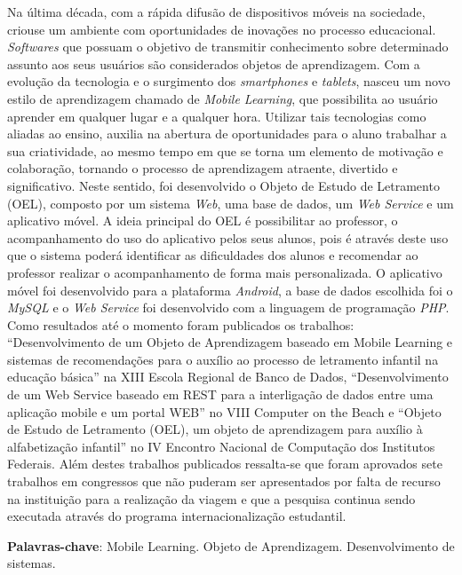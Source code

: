 \documentclass[article,12pt,onesidea,4paper,english,brazil]{abntex2}
\begin{document}
	\noindent Na última década, com a rápida difusão de dispositivos móveis na sociedade, criouse
	um ambiente com oportunidades de inovações no processo educacional.
	\textit{Softwares} que possuam o objetivo de transmitir conhecimento sobre determinado
	assunto aos seus usuários são considerados objetos de aprendizagem. Com a
	evolução da tecnologia e o surgimento dos \textit{smartphones} e \textit{tablets}, nasceu um novo
	estilo de aprendizagem chamado de \textit{Mobile Learning}, que possibilita ao usuário
	aprender em qualquer lugar e a qualquer hora. Utilizar tais tecnologias como aliadas
	ao ensino, auxilia na abertura de oportunidades para o aluno trabalhar a sua
	criatividade, ao mesmo tempo em que se torna um elemento de motivação e
	colaboração, tornando o processo de aprendizagem atraente, divertido e
	significativo. Neste sentido, foi desenvolvido o Objeto de Estudo de Letramento
	(OEL), composto por um sistema \textit{Web}, uma base de dados, um \textit{Web Service} e um
	aplicativo móvel. A ideia principal do OEL é possibilitar ao professor, o
	acompanhamento do uso do aplicativo pelos seus alunos, pois é através deste uso
	que o sistema poderá identificar as dificuldades dos alunos e recomendar ao
	professor realizar o acompanhamento de forma mais personalizada. O aplicativo
	móvel foi desenvolvido para a plataforma \textit{Android}, a base de dados escolhida foi o
\textit{MySQL} e o \textit{Web Service} foi desenvolvido com a linguagem de programação \textit{PHP}.
	Como resultados até o momento foram publicados os trabalhos: “Desenvolvimento
	de um Objeto de Aprendizagem baseado em Mobile Learning e sistemas de
	recomendações para o auxílio ao processo de letramento infantil na educação
	básica” na XIII Escola Regional de Banco de Dados, “Desenvolvimento de um Web
	Service baseado em REST para a interligação de dados entre uma aplicação mobile
	e um portal WEB” no VIII Computer on the Beach e “Objeto de Estudo de
	Letramento (OEL), um objeto de aprendizagem para auxílio à alfabetização infantil”
	no IV Encontro Nacional de Computação dos Institutos Federais. Além destes
	trabalhos publicados ressalta-se que foram aprovados sete trabalhos em congressos
	que não puderam ser apresentados por falta de recurso na instituição para a
	realização da viagem e que a pesquisa continua sendo executada através do
	programa internacionalização estudantil.
	
	\vspace{\onelineskip}
	
	\noindent
	\textbf{Palavras-chave}: Mobile Learning. Objeto de Aprendizagem. Desenvolvimento de
	sistemas.
	
\end{document}
